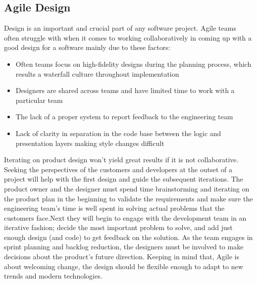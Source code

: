 \documentclass[sigplan,screen]{acmart}
\begin{document}
\subsection{Agile Design}
Design is an important and crucial part of any software project. Agile teams often struggle with when it comes to working collaboratively in coming up with a good design for a software mainly due to these factors:
\begin{itemize}
    \item Often teams focus on high-fidelity designs during the planning process, which results a waterfall culture throughout implementation
    \item Designers are shared across teams and have limited time to work with a particular team
    \item The lack of a proper system to report feedback to the engineering team
    \item Lack of clarity in separation in the code base between the logic and presentation layers making style changes difficult
\end{itemize}
Iterating on product design won't yield great results if it is not collaborative. Seeking the perspectives of the customers and developers at the outset of a project will help with the first design and guide the subsequent iterations. The product owner and the designer must spend time brainstorming and iterating on the product plan in the beginning to validate the requirements and make sure the engineering team’s time is well spent in solving actual problems that the customers face.Next they will begin to engage with the development team in an iterative fashion; decide the most important problem to solve, and add just enough design (and code) to get feedback on the solution. As the team engages in sprint planning and backlog reduction, the designers must be involved to make decisions about the product’s future direction. Keeping in mind that, Agile is about welcoming change, the design should be flexible enough to adapt to new trends and modern technologies.
\end{document}
